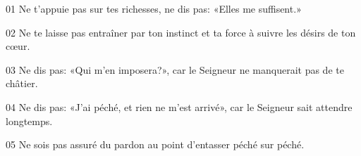 01 Ne t’appuie pas sur tes richesses, ne dis pas: «Elles me suffisent.»

02 Ne te laisse pas entraîner par ton instinct et ta force à suivre les désirs de ton cœur.

03 Ne dis pas: «Qui m’en imposera?», car le Seigneur ne manquerait pas de te châtier.

04 Ne dis pas: «J’ai péché, et rien ne m’est arrivé», car le Seigneur sait attendre longtemps.

05 Ne sois pas assuré du pardon au point d’entasser péché sur péché.
